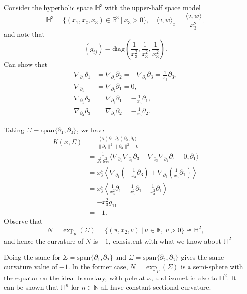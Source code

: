 \documentclass[letter-paper]{tufte-book}
\newenvironment{example}[1][Example]{\begin{trivlist}
\item[\hskip \labelsep {\bfseries #1}]}{\end{trivlist}}
\begin{document}
\begin{example}
  Consider the hyperbolic space $\mathbb{H}^3$ with the upper-half space model
  \begin{equation*}
    \mathbb{H}^3 = \{ (x_1, x_2, x_3) \in \mathbb{R}^3 \ |\ x_3>0\}, \quad \langle v,w\rangle_x = \frac{\langle v,w\rangle}{x_3^2},
  \end{equation*}
  and note that
  \begin{equation*}
    (g_{ij}) = \mbox{diag}\left(\frac{1}{x_3^2}, \frac{1}{x_3^2}, \frac{1}{x_3^2}\right).
  \end{equation*}
  Can show that
  \begin{align*}
    \nabla_{\partial_1} \partial_1 &= \nabla_{\partial_2} \partial_2 = -\nabla_{\partial_3}\partial_3 = \frac{1}{x_3}\partial_3,\\
    \nabla_{\partial_1} &= \nabla_{\partial_2}\partial_1 = 0,\\
    \nabla_{\partial_1}\partial_3 &= \nabla_{\partial_3}\partial_1 = -\frac{1}{x_3}\partial_1,\\
    \nabla_{\partial_2}\partial_3 &= \nabla_{\partial_3}\partial_2 = -\frac{1}{x_3}\partial_2.
  \end{align*}
  
  Taking $\Sigma = \mbox{span}\{\partial_1, \partial_3\}$, we have
  \begin{align*}
    K(x, \Sigma) 
      &= \frac{\langle R(\partial_1, \partial_3)\partial_3, \partial_1\rangle}{\|\partial_1\|^2 \|\partial_3\|^2 - 0}\\
      &= \frac{1}{g_{11}^2 g_{33}^2} \langle \nabla_{\partial_1}\nabla_{\partial_3} \partial_3 - \nabla_{\partial_3}\nabla_{\partial_1}\partial_3 - 0, \partial_1 \rangle\\
      &= x_3^4 \left\langle \nabla_{\partial_1}\left(-\frac{1}{x_3}\partial_3\right) + \nabla_{\partial_3}\left(\frac{1}{x_3}\partial_1\right) \right\rangle\\
      &= x_3^4 \left\langle \frac{1}{x_3^2}\partial_1 - \frac{1}{x_3^2}\partial_1 - \frac{1}{x_3^2}\partial_1\right\rangle\\
      &= -x_3^2 g_{11} \\
      &= -1.
  \end{align*}
  Observe that
  \begin{equation*}
    N = \exp_p(\Sigma) = \{(u, x_2, v)\ |\ u\in\mathbb{R},\ v>0\} \cong \mathbb{H}^2,
  \end{equation*}
  and hence the curvature of $N$ is $-1$, consistent with what we know about $\mathbb{H}^2$.
  
  Doing the same for $\Sigma = \mbox{span}\{\partial_1, \partial_2\}$ and $\Sigma = \mbox{span}\{\partial_2, \partial_3\}$ gives the same curvature value of $-1$. In the former case, $N = \exp_p(\Sigma)$ is a semi-sphere with the equator on the ideal boundary, with pole at $x$, and isometric also to $\mathbb{H}^2$. It can be shown that $\mathbb{H}^n$ for $n\in\mathbb{N}$ all have constant sectional curvature.
\end{example}
\end{document}

